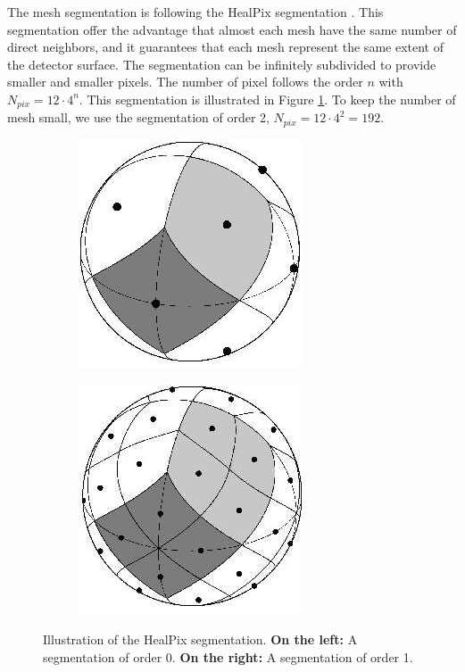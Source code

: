 \documentclass[../main.tex]{subfiles}
\begin{document}
The mesh segmentation is following the HealPix segmentation \cite{gorski_healpix_2005}. This segmentation offer the advantage that almost each mesh have the same number of direct neighbors, and it guarantees that each mesh represent the same extent of the detector surface. The segmentation can be infinitely subdivided to provide smaller and smaller pixels. The number of pixel follows the order $n$ with $N_{pix} = 12 \cdot 4^n$. This segmentation is illustrated in Figure \ref{fig:jgnn:healpix}. To keep the number of mesh small, we use the segmentation of order 2, $N_{pix} = 12 \cdot 4^2 = 192$.

\begin{figure}
  \centering
  \begin{subfigure}[t]{0.48\linewidth}
    \centering
    \includegraphics[width=0.5\linewidth]{images/jgnn/healpix_0.jpg}
  \end{subfigure}
  \hfill
  \begin{subfigure}[t]{0.48\linewidth}
    \centering
    \includegraphics[width=0.5\linewidth]{images/jgnn/healpix_1.jpg}
  \end{subfigure}
  \caption{Illustration of the HealPix segmentation. \textbf{On the left:} A segmentation of order 0. \textbf{On the right:} A segmentation of order 1.}
  \label{fig:jgnn:healpix}
\end{figure}
\end{document}
